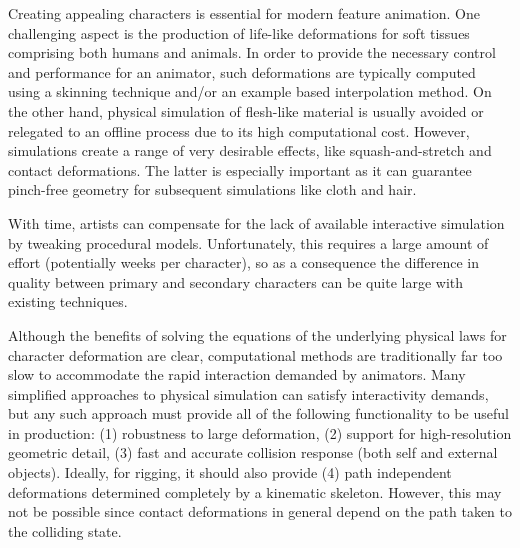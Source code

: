 Creating appealing characters is essential for modern feature animation. One challenging aspect is the production of life-like deformations for soft tissues comprising both humans and animals. In order to provide the necessary control and performance for an animator, such deformations are typically computed using a skinning technique and/or an example based interpolation method. On the other hand, physical simulation of flesh-like material is usually avoided or relegated to an offline process due to its high computational cost. However, simulations create a range of very desirable effects, like squash-and-stretch and contact deformations. The latter is especially important as it can guarantee pinch-free geometry for subsequent simulations like cloth and hair. 

With time, artists can compensate for the lack of available interactive simulation by tweaking procedural models. Unfortunately, this requires a large amount of effort (potentially weeks per character), so as a consequence the difference in quality between primary and secondary characters can be quite large with existing techniques.

Although the benefits of solving the equations of the underlying physical laws for character deformation are clear, computational methods are traditionally far too slow to accommodate the rapid interaction demanded by animators. Many simplified approaches to physical simulation can satisfy interactivity demands, but any such approach must provide all of the following functionality to be useful in production: (1) robustness to large deformation, (2) support for high-resolution geometric detail, (3) fast and accurate collision response (both self and external objects). Ideally, for rigging, it should also provide (4) path independent deformations determined completely by a kinematic skeleton. However, this may not be possible since contact deformations in general depend on the path taken to the colliding state.


